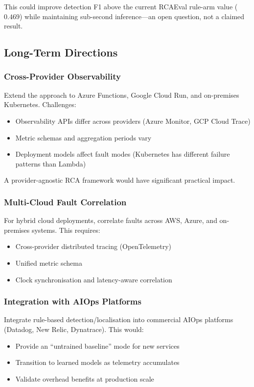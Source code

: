 This could improve detection F1 above the current RCAEval rule-arm value ($0.469$) while maintaining sub-second inference---an open question, not a claimed result.

\subsection{Long-Term Directions}

\subsubsection{Cross-Provider Observability}

Extend the approach to Azure Functions, Google Cloud Run, and on-premises Kubernetes. Challenges:
\begin{itemize}
    \item Observability APIs differ across providers (Azure Monitor, GCP Cloud Trace)
    \item Metric schemas and aggregation periods vary
    \item Deployment models affect fault modes (Kubernetes has different failure patterns than Lambda)
\end{itemize}

A provider-agnostic RCA framework would have significant practical impact.

\subsubsection{Multi-Cloud Fault Correlation}

For hybrid cloud deployments, correlate faults across AWS, Azure, and on-premises systems. This requires:
\begin{itemize}
    \item Cross-provider distributed tracing (OpenTelemetry)
    \item Unified metric schema
    \item Clock synchronisation and latency-aware correlation
\end{itemize}

\subsubsection{Integration with AIOps Platforms}

Integrate rule-based detection/localisation into commercial AIOps platforms (Datadog, New Relic, Dynatrace). This would:
\begin{itemize}
    \item Provide an ``untrained baseline'' mode for new services
    \item Transition to learned models as telemetry accumulates
    \item Validate overhead benefits at production scale
\end{itemize}

